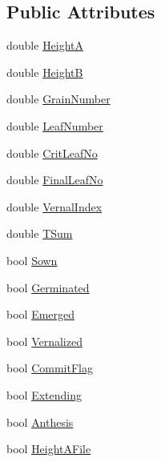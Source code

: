 \subsection*{Public Attributes}
\begin{DoxyCompactItemize}
\item 
double \hyperlink{classcrop_parameters_rye_and_wweat_a3383b9c1cd67a8e2849069ab73e510a0}{HeightA}
\item 
double \hyperlink{classcrop_parameters_rye_and_wweat_a4c18bc57eb2a018846c2c672c82a7f21}{HeightB}
\item 
double \hyperlink{classcrop_parameters_rye_and_wweat_a92d3a259d099296261d7d8b854237d4b}{GrainNumber}
\item 
double \hyperlink{classcrop_parameters_rye_and_wweat_a3fb6803bf514001baa034f34cd7acd81}{LeafNumber}
\item 
double \hyperlink{classcrop_parameters_rye_and_wweat_acb6111ef3abf67b60318b74ddac82ff3}{CritLeafNo}
\item 
double \hyperlink{classcrop_parameters_rye_and_wweat_ad55f194f58649afcf34b71b77903af30}{FinalLeafNo}
\item 
double \hyperlink{classcrop_parameters_rye_and_wweat_a816cb2be68c2cfaeaa181be29d381cee}{VernalIndex}
\item 
double \hyperlink{classcrop_parameters_rye_and_wweat_a5880a14c06ea2f3f008269bed43f3e96}{TSum}
\item 
bool \hyperlink{classcrop_parameters_rye_and_wweat_ac8efa58bd25cff5c5dbc5830e647dbe5}{Sown}
\item 
bool \hyperlink{classcrop_parameters_rye_and_wweat_a75bf7ecda909f6972d31157ff4cf7c4d}{Germinated}
\item 
bool \hyperlink{classcrop_parameters_rye_and_wweat_a5647ce289875026f68655017dc169b7b}{Emerged}
\item 
bool \hyperlink{classcrop_parameters_rye_and_wweat_acfe10c34164be015d900c88aaa4a1376}{Vernalized}
\item 
bool \hyperlink{classcrop_parameters_rye_and_wweat_a0063fb18264bd255d4899581ab4d08c0}{CommitFlag}
\item 
bool \hyperlink{classcrop_parameters_rye_and_wweat_a8010d7ac6f65095a3c34a7e142765acc}{Extending}
\item 
bool \hyperlink{classcrop_parameters_rye_and_wweat_a2499e4336e03b175a16225abb190ca1c}{Anthesis}
\item 
bool \hyperlink{classcrop_parameters_rye_and_wweat_a855c81a0c86a96b8bb69132c0e437a26}{HeightAFile}
\item 

\end{DoxyCompactItemize}
